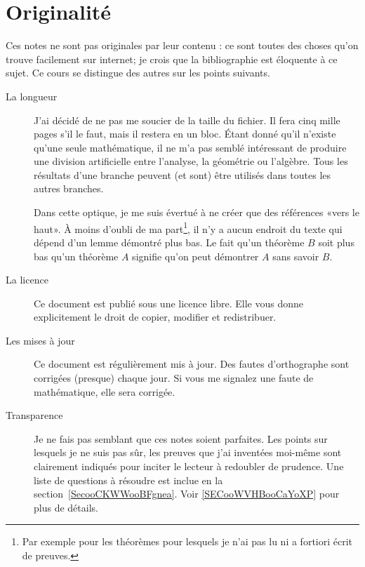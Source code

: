 \section{Originalité}

Ces notes ne sont pas originales par leur contenu : ce sont toutes des choses qu'on trouve facilement sur internet; je crois que la bibliographie est éloquente à ce sujet. Ce cours se distingue des autres sur les points suivants.
\begin{description}
    \item[La longueur] J'ai décidé de ne pas me soucier de la taille du fichier. Il fera cinq mille pages s'il le faut, mais il restera en un bloc. Étant donné qu'il n'existe qu'une seule mathématique, il ne m'a pas semblé intéressant de produire une division artificielle entre l'analyse, la géométrie ou l'algèbre. Tous les résultats d'une branche peuvent (et sont) être utilisés dans toutes les autres branches.

        Dans cette optique, je me suis évertué à ne créer que des références «vers le haut». À moins d'oubli de ma part\footnote{Par exemple pour les théorèmes pour lesquels je n'ai pas lu ni a fortiori écrit de preuves.}, il n'y a aucun endroit du texte qui dépend d'un lemme démontré plus bas. Le fait qu'un théorème \( B\) soit plus bas qu'un théorème \( A\) signifie qu'on peut démontrer \( A\) sans savoir \( B\).

    \item[La licence] Ce document est publié sous une licence libre. Elle vous donne explicitement le droit de copier, modifier et redistribuer.

    \item[Les mises à jour] Ce document est régulièrement mis à jour. Des fautes d'orthographe sont corrigées (presque) chaque jour. Si vous me signalez une faute de mathématique, elle sera corrigée.
    \item[Transparence] Je ne fais pas semblant que ces notes soient parfaites. Les points sur lesquels je ne suis pas sûr, les preuves que j'ai inventées moi-même sont clairement indiqués pour inciter le lecteur à redoubler de prudence. Une liste de questions à résoudre est inclue en la section~\ref{SecooCKWWooBFgnea}. Voir \ref{SECooWVHBooCaYoXP} pour plus de détails.
\end{description}

